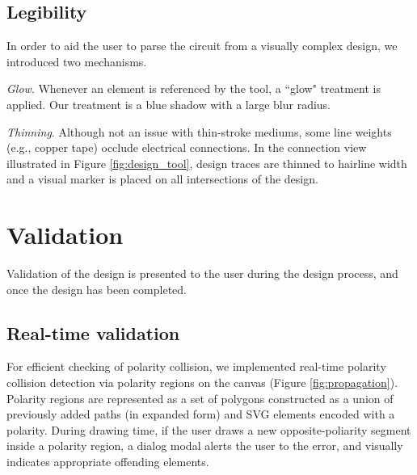\documentclass{sigchi}
\begin{document}
    \noindent{}
    
    \subsection{Legibility}
        In order to aid the user to parse the circuit from a visually complex design, we introduced two mechanisms. 
        
        \textit{Glow}. Whenever an element is referenced by the tool, a ``glow" treatment is applied. Our treatment is a blue shadow with a large blur radius. 
        
        \textit{Thinning}. Although not an issue with thin-stroke mediums, some line weights (e.g., copper tape) occlude electrical connections. In the connection view illustrated in Figure \ref{fig:design_tool}, design traces are thinned to hairline width and a visual marker is placed on all intersections of the design.
        
\section{Validation}
    Validation of the design is presented to the user during the design process, and once the design has been completed. %
    \subsection{Real-time validation}
        For efficient checking of polarity collision, we implemented real-time polarity collision detection via polarity regions on the canvas (Figure \ref{fig:propagation}). Polarity regions are represented as a set of polygons constructed as a union of previously added paths (in expanded form) and SVG elements encoded with a polarity. During drawing time, if the user draws a new opposite-poliarity segment inside a polarity region, a dialog modal alerts the user to the error, and visually indicates appropriate offending elements.
\end{document}
